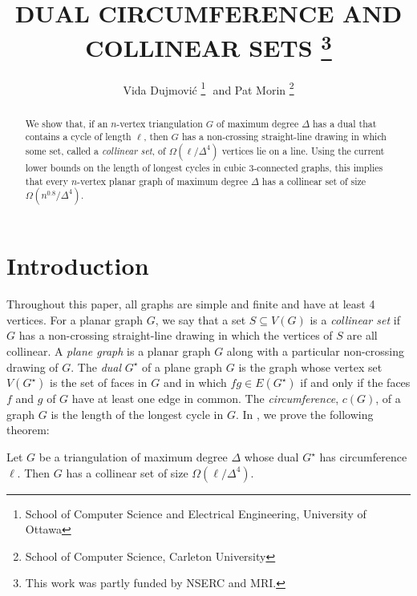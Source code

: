 \documentclass{patmorin}
\title{\MakeUppercase{Dual Circumference and Collinear Sets}%
    \thanks{This work was partly funded by NSERC and MRI.}}
\author{Vida Dujmovi\'c%
        \thanks{School of Computer Science and Electrical Engineering,
                University of Ottawa}\,\, and
        Pat Morin%
        \thanks{School of Computer Science, Carleton University}}
\newcommand{\dual}[1]{{#1}^\star}
\begin{document}
\maketitle


\begin{abstract}
   We show that, if an $n$-vertex triangulation $G$ of maximum degree $\Delta$ has a dual that contains a cycle of length $\ell$, then $G$ has a non-crossing straight-line drawing in which some set, called a \emph{collinear set}, of $\Omega(\ell/\Delta^4)$ vertices lie on a line.  Using the current lower bounds on the length of longest cycles in cubic 3-connected graphs, this implies that every $n$-vertex planar graph of maximum degree $\Delta$ has a collinear set of size $\Omega(n^{0.8}/\Delta^4)$.
\end{abstract}

\section{Introduction}

Throughout this paper, all graphs are simple and finite and have at least
4 vertices.  For a planar graph $G$, we say that a set $S\subseteq V(G)$
is a \emph{collinear set} if $G$ has a non-crossing straight-line drawing
in which the vertices of $S$ are all collinear.  A \emph{plane graph} is
a planar graph $G$ along with a particular non-crossing drawing of $G$.
The \emph{dual} $\dual{G}$ of a plane graph $G$ is the graph whose
vertex set $V(\dual{G})$ is the set of faces in $G$ and in which $fg\in
E(\dual{G})$ if and only if the faces $f$ and $g$ of $G$ have at least
one edge in common.  The \emph{circumference}, $c(G)$, of a graph $G$
is the length of the longest cycle in $G$. In , we prove
the following theorem:

\begin{thm}
  Let $G$ be a triangulation of maximum degree $\Delta$ whose dual
  $\dual{G}$ has circumference $\ell$. Then $G$ has a collinear set of
  size $\Omega(\ell/\Delta^4)$.
\end{thm}
\end{document}
